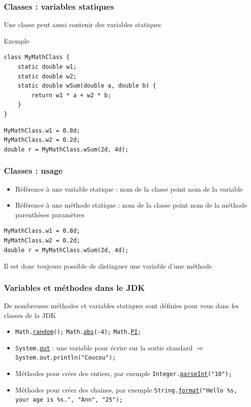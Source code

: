 \documentclass[english, french]{beamer}
\begin{document}
\begin{frame}[fragile]
	\frametitle{Classes : variables statiques}
	Une classe peut aussi contenir des variables statiques
	\begin{block}{Exemple}
		\begin{lstlisting}
class MyMathClass {
	static double w1;
	static double w2;
	static double wSum(double a, double b) {
		return w1 * a + w2 * b;
	}
}
		\end{lstlisting}	
	\end{block}
	\begin{lstlisting}
MyMathClass.w1 = 0.8d;
MyMathClass.w2 = 0.2d;
double r = MyMathClass.wSum(2d, 4d);
	\end{lstlisting}
\end{frame}

\begin{frame}[fragile]
	\frametitle{Classes : usage}
	\begin{itemize}
		\item Référence à une variable statique : nom de la classe point nom de la variable
		\item Référence à une méthode statique : nom de la classe point nom de la méthode parenthèses paramètres
	\end{itemize}
	\begin{lstlisting}
MyMathClass.w1 = 0.8d;
MyMathClass.w2 = 0.2d;
double r = MyMathClass.wSum(2d, 4d);
	\end{lstlisting}
	Il est donc toujours possible de distinguer une variable d’une méthode
\end{frame}

\begin{frame}
	\frametitle{Variables et méthodes dans le JDK}
	De nombreuses méthodes et variables statiques sont définies pour vous dans les classes de la JDK
	\begin{itemize}
		\item \texttt{Math.\href{https://docs.oracle.com/en/java/javase/11/docs/api/java.base/java/lang/Math.html\#random()}{random}();}
			\texttt{Math.\href{https://docs.oracle.com/en/java/javase/11/docs/api/java.base/java/lang/Math.html\#abs(double)}{abs}(-4);}
			\texttt{Math.\href{https://docs.oracle.com/en/java/javase/11/docs/api/java.base/java/lang/Math.html\#PI}{PI};}
		\item \texttt{System.\href{https://docs.oracle.com/en/java/javase/11/docs/api/java.base/java/lang/System.html\#out}{out}} : une variable pour écrire sur la sortie standard $⇒$ \texttt{System.out.println("Coucou");}
		\item Méthodes pour créer des entiers, par exemple \texttt{Integer.\href{https://docs.oracle.com/en/java/javase/11/docs/api/java.base/java/lang/Integer.html\#parseInt(java.lang.String)}{parseInt}("10");}
		\item Méthodes pour créer des chaines, par exemple \texttt{String.\href{https://docs.oracle.com/en/java/javase/11/docs/api/java.base/java/lang/String.html\#format(java.lang.String,java.lang.Object...)}{format}("Hello \%s, your age is \%s.", "Ann", "25");}
	\end{itemize}
\end{frame}
\end{document}
